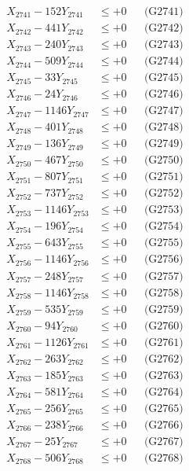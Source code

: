 \documentclass[a4paper,10pt]{article}
\begin{document}
{\begin{align}
\allowbreak
X_{2741} - 152Y_{2741} &\leq +0 && \text{(G2741)} \\
X_{2742} - 441Y_{2742} &\leq +0 && \text{(G2742)} \\
X_{2743} - 240Y_{2743} &\leq +0 && \text{(G2743)} \\
X_{2744} - 509Y_{2744} &\leq +0 && \text{(G2744)} \\
X_{2745} - 33Y_{2745} &\leq +0 && \text{(G2745)} \\
X_{2746} - 24Y_{2746} &\leq +0 && \text{(G2746)} \\
X_{2747} - 1146Y_{2747} &\leq +0 && \text{(G2747)} \\
X_{2748} - 401Y_{2748} &\leq +0 && \text{(G2748)} \\
X_{2749} - 136Y_{2749} &\leq +0 && \text{(G2749)} \\
X_{2750} - 467Y_{2750} &\leq +0 && \text{(G2750)} \\
\allowbreak
X_{2751} - 807Y_{2751} &\leq +0 && \text{(G2751)} \\
X_{2752} - 737Y_{2752} &\leq +0 && \text{(G2752)} \\
X_{2753} - 1146Y_{2753} &\leq +0 && \text{(G2753)} \\
X_{2754} - 196Y_{2754} &\leq +0 && \text{(G2754)} \\
X_{2755} - 643Y_{2755} &\leq +0 && \text{(G2755)} \\
X_{2756} - 1146Y_{2756} &\leq +0 && \text{(G2756)} \\
X_{2757} - 248Y_{2757} &\leq +0 && \text{(G2757)} \\
X_{2758} - 1146Y_{2758} &\leq +0 && \text{(G2758)} \\
X_{2759} - 535Y_{2759} &\leq +0 && \text{(G2759)} \\
X_{2760} - 94Y_{2760} &\leq +0 && \text{(G2760)} \\
\allowbreak
X_{2761} - 1126Y_{2761} &\leq +0 && \text{(G2761)} \\
X_{2762} - 263Y_{2762} &\leq +0 && \text{(G2762)} \\
X_{2763} - 185Y_{2763} &\leq +0 && \text{(G2763)} \\
X_{2764} - 581Y_{2764} &\leq +0 && \text{(G2764)} \\
X_{2765} - 256Y_{2765} &\leq +0 && \text{(G2765)} \\
X_{2766} - 238Y_{2766} &\leq +0 && \text{(G2766)} \\
X_{2767} - 25Y_{2767} &\leq +0 && \text{(G2767)} \\
X_{2768} - 506Y_{2768} &\leq +0 && \text{(G2768)} \\

\end{align}}
\end{document}
